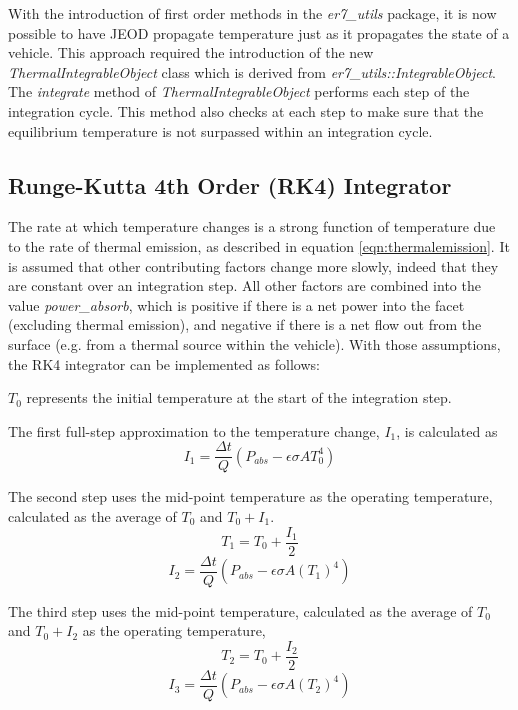 With the introduction of first order methods in the \textit{er7\_utils} package,
it is now possible to have JEOD propagate temperature just as it propagates
the state of a vehicle.  This approach required the introduction of the 
new \textit{ThermalIntegrableObject} class which is derived from
\textit{er7\_utils::IntegrableObject}.  The \textit{integrate} method of
\textit{ThermalIntegrableObject} performs each step of the integration cycle.
This method also checks at each step to make sure that the
equilibrium temperature is not surpassed within an integration cycle.

\subsection{Runge-Kutta 4th Order (RK4) Integrator}\label{ref:thermalRK4integrator}

The rate at which temperature changes is a strong function of
temperature due to the rate of thermal emission, as described 
in equation \ref{eqn:thermalemission}.
It is assumed that other contributing factors change more slowly, 
indeed that they are constant over an integration step.
All other factors are combined into the value \textit{power\_absorb}, which 
is positive if there is a net power into the facet (excluding thermal emission), and negative if there is a net flow out from the surface 
(e.g. from a thermal source within the vehicle).
With those assumptions, the RK4 integrator can be implemented as follows:

$T_0$ represents the initial temperature at the start of the integration step.

The first full-step approximation to the temperature change, $I_1$, is
calculated as 
\begin{equation*}
I_1 = \frac{\Delta t}{Q} \left(  P_{abs} - \epsilon \sigma A T_0^4 \right)
\end{equation*}

The second step uses the mid-point temperature as the operating temperature, calculated as the average of $T_0$ and $T_0 + I_1$.   
\begin{equation*}
T_1 = T_0 + \frac{I_1}{2}
\end{equation*}
\begin{equation*}
I_2 = \frac{\Delta t}{Q} \left(  P_{abs} - \epsilon \sigma A \left(T_1 \right) ^4 \right)
\end{equation*}

The third step uses the mid-point temperature, calculated as the
average of $T_0$ and $T_0 + I_2$ as the operating temperature,  
\begin{equation*}
T_2 = T_0 + \frac{I_2}{2}
\end{equation*}
\begin{equation*}
I_3 = \frac{\Delta t}{Q} \left(  P_{abs} - \epsilon \sigma A \left(T_2 \right) ^4 \right)
\end{equation*}

